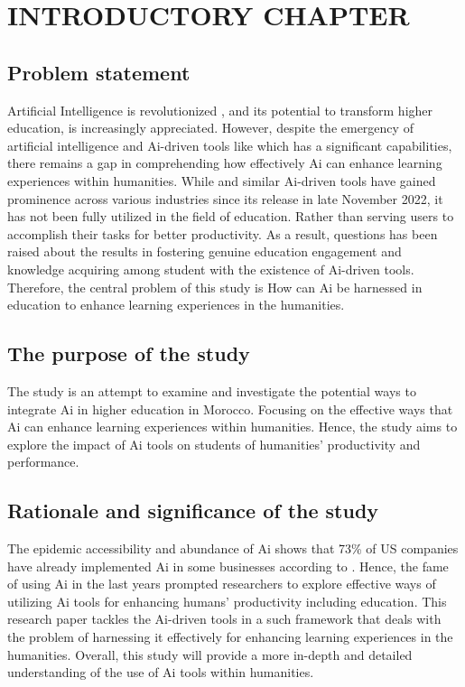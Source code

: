 \chapter{INTRODUCTORY CHAPTER}
\section{Problem statement}
\justifying
Artificial Intelligence is revolutionized , and its potential
to transform higher education, is increasingly appreciated. However, despite the emergency of artificial intelligence and
Ai-driven tools like  which has a significant capabilities,
there remains a gap in comprehending how effectively Ai can 
enhance learning experiences within humanities. While 
and similar Ai-driven tools have gained prominence across various
industries since its release in late November 2022, it has not been
fully utilized in the field of education. Rather than serving users
to accomplish their tasks for better productivity. As a result, questions
has been raised about the results in fostering genuine education engagement
and knowledge acquiring among student with the existence of Ai-driven tools.
Therefore, the central problem of this study is How can Ai be harnessed
in education to enhance learning experiences in the humanities.
\section{The purpose of the study}
\justifying
The study is an attempt to examine and investigate the potential ways to integrate Ai in higher education in Morocco.
Focusing on the effective ways that Ai can enhance learning experiences within humanities. Hence, the study aims to
explore the impact of Ai tools on students of humanities' productivity and performance.
\section{Rationale and significance of the study}
\justifying
The epidemic accessibility and abundance of Ai shows that 73\% of US companies have already
implemented Ai in some businesses according to \citet{pricewaterhousecoopers} .
Hence, the fame of using Ai in the last years prompted researchers to explore effective ways of utilizing Ai tools
for enhancing humans' productivity including education. This research paper tackles the Ai-driven tools in a such framework that
deals with the problem of harnessing it effectively for enhancing learning experiences in the humanities.
Overall, this study will provide a more in-depth and detailed understanding of the use of Ai tools within humanities.
